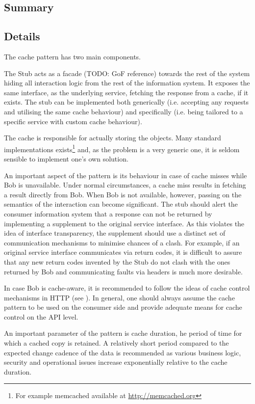 \documentclass[10pt,a4paper]{article}
\begin{document}
\subsection{Summary}

\subsection{Details}
The cache pattern has two main components.

The Stub acts as a facade (TODO: GoF reference) towards the rest of the system hiding all interaction logic from the rest of the information system. It exposes the same interface, as the underlying service, fetching the response from a cache, if it exists. The stub can be implemented both generically (i.e. accepting any requests and utilising the same cache behaviour) and specifically (i.e. being tailored to a specific service with custom cache behaviour). 

The cache is responsible for actually storing the objects. Many standard implementations exists\footnote{For example memcached available at \url{http://memcached.org}} and, as the problem is a very generic one, it is seldom sensible to implement one's own solution. 

An important aspect of the pattern is its behaviour in case of cache misses while Bob is unavailable. Under normal circumstances, a cache miss results in fetching a result directly from Bob. When Bob is not available, however, passing on the semantics of the interaction can become significant. The stub should alert the consumer information system that a response can not be returned by implementing a supplement to the original service interface. As this violates the idea of interface transparency, the supplement should use a distinct set of communication mechanisms to minimise chances of a clash. For example, if an original service interface communicates via return codes, it is difficult to assure that any new return codes invented by the Stub do not clash with the ones returned by Bob and communicating faults via headers is much more desirable.

In case Bob is cache-aware, it is recommended to follow the ideas of cache control mechanisms in HTTP (see \cite[sec. 13]{RFC2616}). In general, one should always assume the cache pattern to be used on the consumer side and provide adequate means for cache control on the API level. 

An important parameter of the pattern is cache duration, he period of time for which a cached copy is retained. A relatively short period compared to the expected change cadence of the data is recommended as various business logic, security and operational issues increase exponentially relative to the cache duration. 
\end{document}
